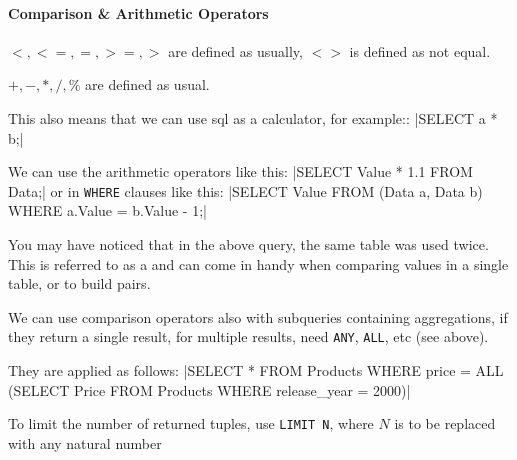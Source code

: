 \paragraph{Comparison \& Arithmetic Operators}
 $<, <=, =, >=, >$ are defined as usually, $<>$ is defined as not equal.

 $+, -, *, /, \%$ are defined as usual.

This also means that we can use \acrshort{sql} as a calculator, for example::
|SELECT a * b;|

We can use the arithmetic operators like this:
|SELECT Value * 1.1 FROM Data;|
or in \texttt{WHERE} clauses like this:
|SELECT Value FROM (Data a, Data b) WHERE a.Value = b.Value - 1;|

\inlineremark You may have noticed that in the above query, the same table was used twice.
This is referred to as a  and can come in handy when comparing values in a single table,
or to build pairs.

We can use comparison operators also with subqueries containing aggregations, if they return a single result, for multiple results, need \texttt{ANY}, \texttt{ALL}, etc (see above).

They are applied as follows:
|SELECT * FROM Products WHERE price = ALL (SELECT Price FROM Products WHERE release_year = 2000)|

To limit the number of returned tuples, use \texttt{LIMIT N}, where $N$ is to be replaced with any natural number
